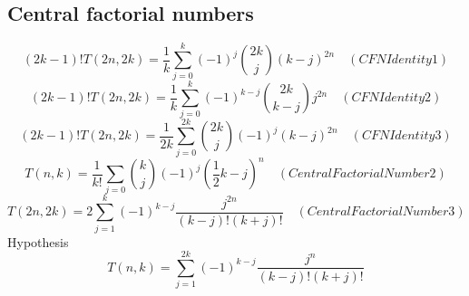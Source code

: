 \subsection{Central factorial numbers}\label{subsec:central-factorial-numbers}

\begin{equation*}
(2k-1)
    !T(2n,2k) = \frac{1}{k} \sum_{j=0}^{k} (-1)^j \binom{2k}{j} (k-j)^{2n} \quad
    (CFNIdentity1)
\end{equation*}
\begin{equation*}
(2k-1)
    !T(2n,2k) = \frac{1}{k} \sum_{j=0}^{k} (-1)^{k-j} \binom{2k}{k-j} j^{2n} \quad
    (CFNIdentity2)
\end{equation*}
\begin{equation*}
(2k-1)
    !T(2n, 2k) = \frac{1}{2k} \sum_{j=0}^{2k} \binom{2k}{j} (-1)^{j} (k-j)^{2n} \quad
    (CFNIdentity3)
\end{equation*}
\begin{equation*}
    T(n,k) = \frac{1}{k!} \sum_{j=0} \binom{k}{j} (-1)^{j} \left( \frac{1}{2}k - j \right)^{n} \quad
    (CentralFactorialNumber2)
\end{equation*}
\begin{equation*}
    T(2n,2k) = 2 \sum_{j=1}^{k} (-1)^{k-j} \frac{j^{2n}}{(k-j)! (k+j)!} \quad
    (CentralFactorialNumber3)
\end{equation*}
Hypothesis
\begin{equation*}
    T(n,k) = \sum_{j=1}^{2k} (-1)^{k-j} \frac{j^{n}}{(k-j)! (k+j)!}
\end{equation*}